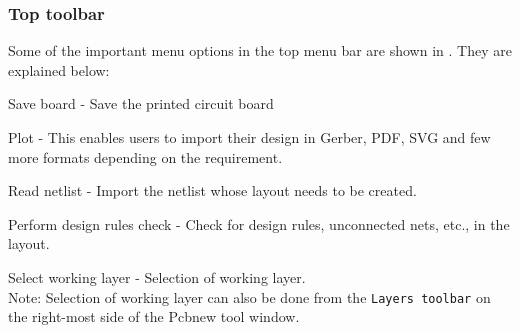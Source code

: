 \subsubsection{Top toolbar}
Some of the important menu options in the top menu bar are shown in
. They are explained below:
\begin{compactenum}
\item Save board - Save the printed circuit board
 \item Plot - This enables users to import their design in Gerber, PDF, SVG and few more formats depending on the requirement.
\item Read netlist - Import the netlist whose layout needs to be
  created.
\item Perform design rules check - Check for design rules, unconnected
  nets, etc., in the layout.
\item Select working layer - Selection of working layer.\\
Note: Selection of working layer can also be done from the \texttt{Layers toolbar} on the right-most side of the Pcbnew tool window.
\end{compactenum} 

